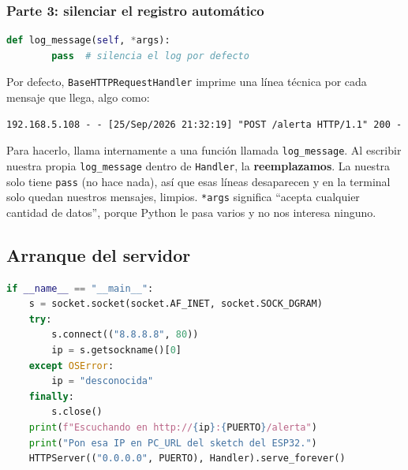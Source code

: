 \documentclass[11pt,a4paper]{article}
\begin{document}
\subsubsection*{Parte 3: silenciar el registro automático}

\begin{lstlisting}[language=Python,firstnumber=39]
    def log_message(self, *args):
        pass  # silencia el log por defecto
\end{lstlisting}

Por defecto, \texttt{BaseHTTPRequestHandler} imprime una línea técnica por cada
mensaje que llega, algo como:
\begin{lstlisting}[numbers=none,language={}]
192.168.5.108 - - [25/Sep/2026 21:32:19] "POST /alerta HTTP/1.1" 200 -
\end{lstlisting}
Para hacerlo, llama internamente a una función llamada \texttt{log\_message}. Al
escribir nuestra propia \texttt{log\_message} dentro de \texttt{Handler}, la
\textbf{reemplazamos}. La nuestra solo tiene \texttt{pass} (no hace nada), así que
esas líneas desaparecen y en la terminal solo quedan nuestros mensajes, limpios.
\texttt{*args} significa ``acepta cualquier cantidad de datos'', porque Python le
pasa varios y no nos interesa ninguno.

\subsection{Arranque del servidor}

\begin{lstlisting}[language=Python,firstnumber=43]
if __name__ == "__main__":
    s = socket.socket(socket.AF_INET, socket.SOCK_DGRAM)
    try:
        s.connect(("8.8.8.8", 80))
        ip = s.getsockname()[0]
    except OSError:
        ip = "desconocida"
    finally:
        s.close()
    print(f"Escuchando en http://{ip}:{PUERTO}/alerta")
    print("Pon esa IP en PC_URL del sketch del ESP32.")
    HTTPServer(("0.0.0.0", PUERTO), Handler).serve_forever()
\end{lstlisting}
\end{document}
